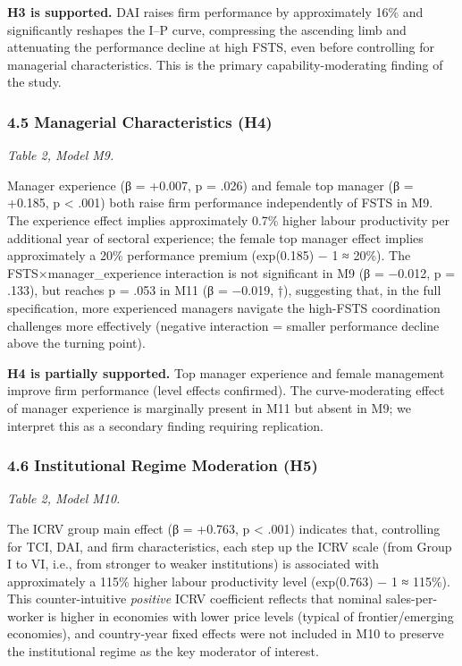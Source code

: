 \documentclass[12pt,a4paper]{article}
\begin{document}
\textbf{H3 is supported.} DAI raises firm performance by approximately
16\% and significantly reshapes the I--P curve, compressing the
ascending limb and attenuating the performance decline at high FSTS,
even before controlling for managerial characteristics. This is the
primary capability-moderating finding of the study.

\hypertarget{45-managerial-characteristics-h4}{%
\subsubsection{4.5 Managerial Characteristics
(H4)}\label{45-managerial-characteristics-h4}}

\emph{Table 2, Model M9.}

Manager experience (β = +0.007, p = .026) and female top manager (β =
+0.185, p \textless{} .001) both raise firm performance independently of
FSTS in M9. The experience effect implies approximately 0.7\% higher
labour productivity per additional year of sectoral experience; the
female top manager effect implies approximately a 20\% performance
premium (exp(0.185) − 1 ≈ 20\%). The FSTS×manager\_experience
interaction is not significant in M9 (β = −0.012, p = .133), but reaches
p = .053 in M11 (β = −0.019, †), suggesting that, in the full
specification, more experienced managers navigate the high-FSTS
coordination challenges more effectively (negative interaction = smaller
performance decline above the turning point).

\textbf{H4 is partially supported.} Top manager experience and female
management improve firm performance (level effects confirmed). The
curve-moderating effect of manager experience is marginally present in
M11 but absent in M9; we interpret this as a secondary finding requiring
replication.

\hypertarget{46-institutional-regime-moderation-h5}{%
\subsubsection{4.6 Institutional Regime Moderation
(H5)}\label{46-institutional-regime-moderation-h5}}

\emph{Table 2, Model M10.}

The ICRV group main effect (β = +0.763, p \textless{} .001) indicates
that, controlling for TCI, DAI, and firm characteristics, each step up
the ICRV scale (from Group I to VI, i.e., from stronger to weaker
institutions) is associated with approximately a 115\% higher labour
productivity level (exp(0.763) − 1 ≈ 115\%). This counter-intuitive
\emph{positive} ICRV coefficient reflects that nominal sales-per-worker
is higher in economies with lower price levels (typical of
frontier/emerging economies), and country-year fixed effects were not
included in M10 to preserve the institutional regime as the key
moderator of interest.
\end{document}
